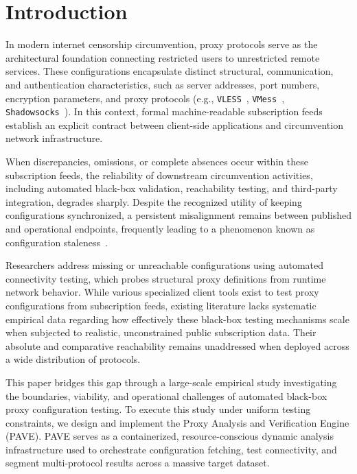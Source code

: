 \documentclass[10pt,conference]{IEEEtran}
\begin{document}
\section{Introduction}
In modern internet censorship circumvention, proxy protocols serve as the architectural foundation connecting restricted users to unrestricted remote services.
These configurations encapsulate distinct structural, communication, and authentication characteristics, such as server addresses, port numbers, encryption parameters, and proxy protocols (e.g., \texttt{VLESS}~\cite{xray_core}, \texttt{VMess}~\cite{v2ray}, \texttt{Shadowsocks}~\cite{shadowsocks}).
In this context, formal machine-readable subscription feeds establish an explicit contract between client-side applications and circumvention network infrastructure.

When discrepancies, omissions, or complete absences occur within these subscription feeds, the reliability of downstream circumvention activities, including automated black-box validation, reachability testing, and third-party integration, degrades sharply.
Despite the recognized utility of keeping configurations synchronized, a persistent misalignment remains between published and operational endpoints, frequently leading to a phenomenon known as configuration staleness~\cite{shadowsocks_gfw,gfw_encrypted}.

Researchers address missing or unreachable configurations using automated connectivity testing, which probes structural proxy definitions from runtime network behavior.
While various specialized client tools exist to test proxy configurations from subscription feeds, existing literature lacks systematic empirical data regarding how effectively these black-box testing mechanisms scale when subjected to realistic, unconstrained public subscription data.
Their absolute and comparative reachability remains unaddressed when deployed across a wide distribution of protocols.

This paper bridges this gap through a large-scale empirical study investigating the boundaries, viability, and operational challenges of automated black-box proxy configuration testing.
To execute this study under uniform testing constraints, we design and implement the Proxy Analysis and Verification Engine (PAVE).
PAVE serves as a containerized, resource-conscious dynamic analysis infrastructure used to orchestrate configuration fetching, test connectivity, and segment multi-protocol results across a massive target dataset.
\end{document}
